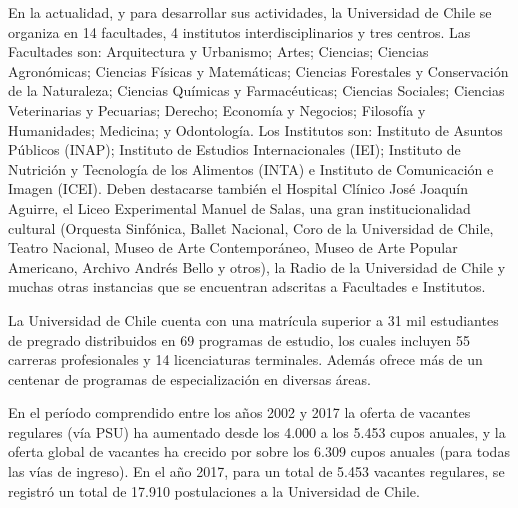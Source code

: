 En la actualidad, y para desarrollar sus actividades, la Universidad de Chile se organiza en
14 facultades, 4 institutos interdisciplinarios y tres centros. Las Facultades son: Arquitectura y
Urbanismo; Artes; Ciencias; Ciencias Agronómicas; Ciencias Físicas y Matemáticas; Ciencias
Forestales y Conservación de la Naturaleza; Ciencias Químicas y Farmacéuticas; Ciencias Sociales;
Ciencias Veterinarias y Pecuarias; Derecho; Economía y Negocios; Filosofía y Humanidades;
Medicina; y Odontología. Los Institutos son: Instituto de Asuntos Públicos (INAP); Instituto
de Estudios Internacionales (IEI); Instituto de Nutrición y Tecnología de los Alimentos (INTA)
e Instituto de Comunicación e Imagen (ICEI). Deben destacarse también el Hospital Clínico
José Joaquín Aguirre, el Liceo Experimental Manuel de Salas, una gran institucionalidad cultural
(Orquesta Sinfónica, Ballet Nacional, Coro de la Universidad de Chile, Teatro Nacional, Museo de
Arte Contemporáneo, Museo de Arte Popular Americano, Archivo Andrés Bello y otros), la Radio
de la Universidad de Chile y muchas otras instancias que se encuentran adscritas a Facultades e
Institutos.

La Universidad de Chile cuenta con una matrícula superior a 31 mil estudiantes de pregrado
distribuidos en 69 programas de estudio, los cuales incluyen 55 carreras profesionales y 
14 licenciaturas terminales. Además ofrece más de un centenar de programas de especialización en
diversas áreas.

En el período comprendido entre los años 2002 y 2017 la oferta de vacantes regulares (vía
PSU) ha aumentado desde los 4.000 a los 5.453 cupos anuales, y la oferta global de vacantes ha
crecido por sobre los 6.309 cupos anuales (para todas las vías de ingreso). En el año 2017, para un
total de 5.453 vacantes regulares, se registró un total de 17.910 postulaciones a la Universidad de
Chile.


